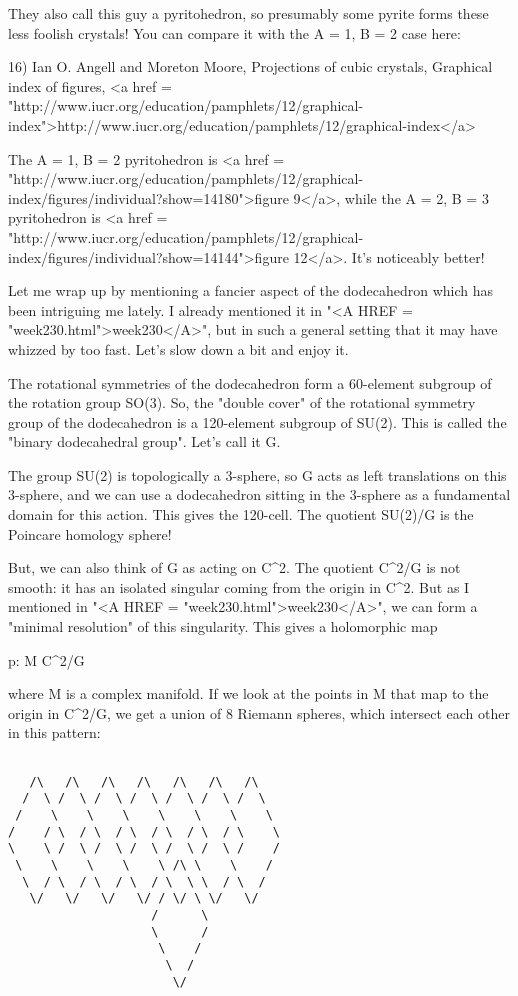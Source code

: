 They also call this guy a pyritohedron, so presumably some 
pyrite forms these less foolish crystals!  You can compare it
with the A = 1, B = 2 case here:

16) Ian O. Angell and Moreton Moore, Projections of cubic crystals,
Graphical index of figures, 
<a href = "http://www.iucr.org/education/pamphlets/12/graphical-index">http://www.iucr.org/education/pamphlets/12/graphical-index</a>

The A = 1, B = 2 pyritohedron is <a href = "http://www.iucr.org/education/pamphlets/12/graphical-index/figures/individual?show=14180">figure 9</a>, while the A = 2, B = 3
pyritohedron is <a href = "http://www.iucr.org/education/pamphlets/12/graphical-index/figures/individual?show=14144">figure 12</a>.  It's noticeably better!

Let me wrap up by mentioning a fancier aspect of the dodecahedron
which has been intriguing me lately.  I already mentioned it in "<A
HREF = "week230.html">week230</A>", but in such a general setting
that it may have whizzed by too fast.  Let's slow down a bit and enjoy
it.

The rotational symmetries of the dodecahedron form a 60-element 
subgroup of the rotation group SO(3).  So, the "double cover" of 
the rotational symmetry group of the dodecahedron is a 120-element 
subgroup of SU(2).  This is called the "binary dodecahedral group".
Let's call it G.  

The group SU(2) is topologically a 3-sphere, so G acts as left 
translations on this 3-sphere, and we can use a dodecahedron sitting 
in the 3-sphere as a fundamental domain for this action.  This gives 
the 120-cell.  The quotient SU(2)/G is the Poincare homology sphere!  

But, we can also think of G as acting on C^{2}.  The quotient C^{2}/G
is not smooth: it has an isolated singular coming from the origin 
in C^{2}.  But as I mentioned in "<A HREF = "week230.html">week230</A>", we can form a "minimal 
resolution" of this singularity.  This gives a holomorphic map

p: M \to  C^{2}/G 

where M is a complex manifold.   If we look at the points in M
that map to the origin in C^{2}/G, we get a union of 8 Riemann spheres, 
which intersect each other in this pattern:


\begin{verbatim}

   /\   /\   /\   /\   /\   /\   /\ 
  /  \ /  \ /  \ /  \ /  \ /  \ /  \
 /    \    \    \    \    \    \    \
/    / \  / \  / \  / \  / \  / \    \ 
\    \ /  \ /  \ /  \ /  \ /  \ /    / 
 \    \    \    \    \ /\ \    \    /
  \  / \  / \  / \  / \  \ \  / \  /
   \/   \/   \/   \/ / \/ \ \/   \/
                    /      \ 
                    \      /
                     \    /
                      \  /
                       \/ 
\end{verbatim}
    
